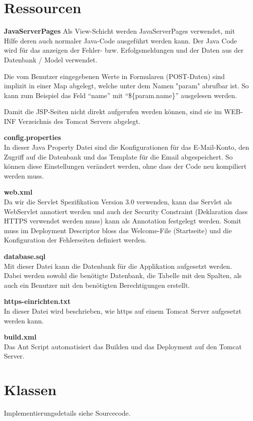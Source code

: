 \documentclass[12pt]{scrartcl}
\begin{document}
\section{Ressourcen}
\textbf{JavaServerPages}\newline
Als View-Schicht werden JavaServerPages verwendet, mit Hilfe deren auch normaler Java-Code ausgeführt werden kann. Der Java Code wird für das anzeigen der Fehler- bzw. Erfolgsmeldungen und der Daten aus der Datenbank / Model verwendet.

Die vom Benutzer eingegebenen Werte in Formularen (POST-Daten) sind implizit in einer Map abgelegt, welche unter dem Namen "param" abrufbar ist. So kann zum Beispiel das Feld "`name"' mit "`\$\{param.name\}"' ausgelesen werden.

Damit die JSP-Seiten nicht direkt aufgerufen werden können, sind sie im WEB-INF Verzeichnis des Tomcat Servers abgelegt.

\textbf{config.properties}\\
In dieser Java Property Datei sind die Konfigurationen für das E-Mail-Konto, den Zugriff auf die Datenbank und das Template für die Email abgespeichert. So können diese Einstellungen verändert werden, ohne dass der Code neu kompiliert werden muss.

\textbf{web.xml}\\
Da wir die Servlet Spezifikation Version 3.0 verwenden, kann das Servlet als WebServlet annotiert werden und auch der Security Constraint (Deklaration dass HTTPS verwendet werden muss) kann als Annotation festgelegt werden. Somit muss im Deployment Descriptor bloss das Welcome-File (Startseite) und die Konfiguration der Fehlerseiten definiert werden.

\textbf{database.sql}\\
Mit dieser Datei kann die Datenbank für die Applikation aufgesetzt werden. Dabei werden sowohl die benötigte Datenbank, die Tabelle mit den Spalten, als auch ein Benutzer mit den benötigten Berechtigungen erstellt.

\textbf{https-einrichten.txt}\\
In dieser Datei wird beschrieben, wie https auf einem Tomcat Server aufgesetzt werden kann.

\textbf{build.xml}\\
Das Ant Script automatisiert das Builden und das Deployment auf den Tomcat Server.

\section{Klassen}
Implementierungsdetails siehe Sourcecode.
\end{document}
